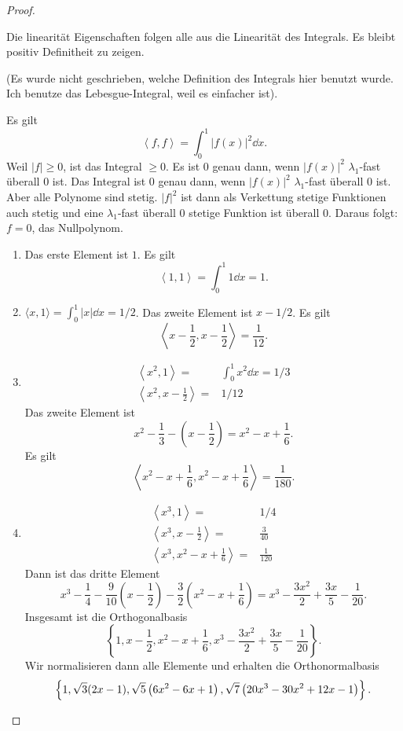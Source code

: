 \begin{proof}
	\begin{parts}
	\item Die linearität Eigenschaften folgen alle aus die Linearität des Integrals. Es bleibt positiv Definitheit zu zeigen.

		(Es wurde nicht geschrieben, welche Definition des Integrals hier benutzt wurde. Ich benutze das Lebesgue-Integral, weil es einfacher ist).
		
		Es gilt
		\[
			\left<f,f \right> =\int_0^1 |f(x)|^2\dd{x}
		.\] 
		Weil $|f|\ge 0$, ist das Integral $\ge 0$. Es ist $0$ genau dann, wenn $|f(x)|^2$ $\lambda_1$-fast überall $0$ ist. Das Integral ist $0$ genau dann, wenn $|f(x)|^2$ $\lambda_1$-fast überall $0$ ist. Aber alle Polynome sind stetig. $|f|^2$ ist dann als Verkettung stetige Funktionen auch stetig und eine $\lambda_1$-fast überall 0 stetige Funktion ist überall $0$. Daraus folgt: $f=0$, das Nullpolynom. 
	\item 
		\begin{enumerate}[label=(\roman*)]
			\item Das erste Element ist $1$. Es gilt
				\[
					\left<1,1 \right> = \int_0^1 1\dd{x}=1
				.\] 
			\item $\langle x,1\rangle=\int_0^1 |x|\dd{x}=1 / 2$. Das zweite Element ist $x-1 / 2$. Es gilt
				\[
				\left<x -\frac{1}{2},x-\frac{1}{2} \right> = \frac{1}{12}
				.\] 
			\item 
				\begin{align*}
					\left<x^2,1 \right> =& \int_0^1 x^2 \dd{x}=1 / 3\\
					\left<x^2, x - \frac{1}{2} \right> =& 1 / 12
				\end{align*}
				Das zweite Element ist
				\[
				x^2-\frac{1}{3}-(x-\frac{1}{2})=x^2-x+\frac{1}{6}
				.\] 
				Es gilt
				\[
				\left<x^2-x+\frac{1}{6},x^2-x+\frac{1}{6} \right> = \frac{1}{180}
				.\] 
			\item
				\begin{align*}
					\left<x^3,1 \right> =& 1 / 4\\
					\left<x^3, x - \frac{1}{2} \right> =& \frac{3}{40}\\
					\left<x^3, x^2-x+\frac{1}{6} \right> =&\frac{1}{120}
				\end{align*}
				Dann ist das dritte Element
				\[
					x^3-\frac{1}{4}-\frac{9}{10}\left( x-\frac{1}{2} \right) -\frac{3}{2}\left( x^2-x+\frac{1}{6} \right)=x^3-\frac{3x^2}{2}+\frac{3x}{5}-\frac{1}{20} 
				.\] 
				Insgesamt ist die Orthogonalbasis
				\[
				\left\{ 1,x-\frac{1}{2},x^2-x+\frac{1}{6},x^3-\frac{3x^2}{2}+\frac{3x}{5}-\frac{1}{20} \right\}  
				.\]
				Wir normalisieren dann alle Elemente und erhalten die Orthonormalbasis
				\[
\left\{1,\sqrt{3} (2 x-1),\sqrt{5} \left(6 x^2-6 x+1\right),\sqrt{7} \left(20 x^3-30 x^2+12 x-1\right)\right\}
.\qedhere\]
		\end{enumerate}
	\end{parts}
\end{proof}
